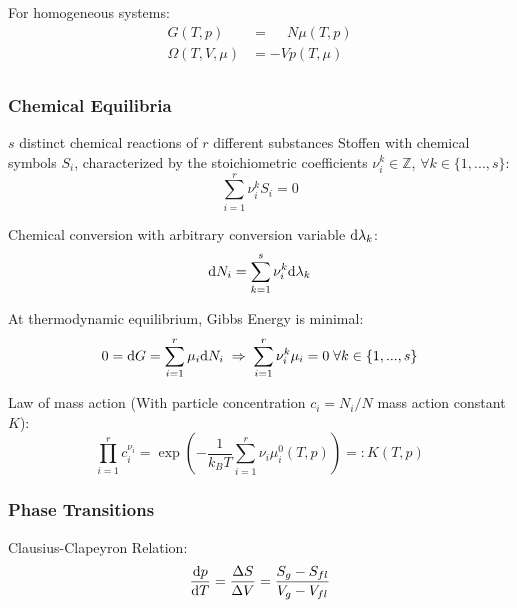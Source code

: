 			\noindent
			For homogeneous systems:
			\begin{equation}
				\begin{aligned}
					G(T,p) &= \phantom{-}N\mu(T,p) \\
					\Omega(T,V,\mu) &= -V p(T,\mu) \\
				\end{aligned}
			\end{equation}

		\subsubsection{Chemical Equilibria}
			\noindent
			$s$ distinct chemical reactions of $r$ different substances Stoffen with chemical symbols $S_i$, characterized by the stoichiometric coefficients $\nu_i^k\in\mathbb{Z}$, $\forall k\in\lbrace1,...,s\rbrace$:
			\begin{equation}
				\sum_{i=1}^r \nu_i^k S_i = 0
			\end{equation}

			\noindent
			Chemical conversion with arbitrary conversion variable $\mathrm{d} \lambda_k$:
			\begin{equation}
				\mathrm{d} N_i = \sum_{k=1}^s \nu_i^k \mathrm{d} \lambda_k
			\end{equation}

			\noindent
			At thermodynamic equilibrium, Gibbs Energy is minimal:
			\begin{equation}
					0 = \mathrm{d} G = \sum_{i=1}^r \mu_i \mathrm{d} N_i \;\Rightarrow\; \sum_{i=1}^r \nu_i^k \mu_i = 0 \;\forall k\in\lbrace1,...,s\rbrace
			\end{equation}

			\noindent
			Law of mass action (With particle concentration $c_i = N_i/N$ mass action constant $K$):
			\begin{equation}
				\prod_{i=1}^r	c_i^{\nu_i} = \exp\left( -\frac{1}{k_B T}\sum_{i=1}^r \nu_i\mu_i^0(T,p) \right) =: K(T,p)
			\end{equation}

		\subsubsection{Phase Transitions}
			\noindent
			Clausius-Clapeyron Relation:
			\begin{equation}
				\frac{\mathrm{d} p}{\mathrm{d} T} = \frac{\Delta S}{\Delta V} = \frac{S_g - S_{fl}}{V_g - V_{fl}}
			\end{equation}

